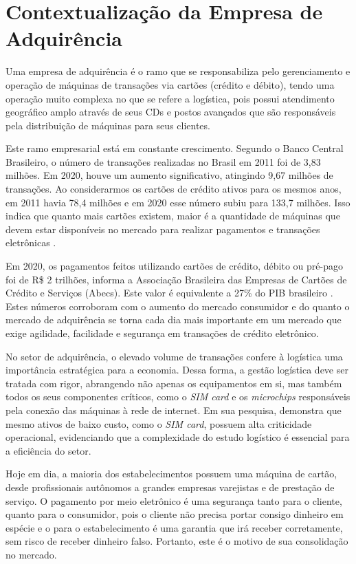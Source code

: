 \section[Contextualização da Empresa de Adquirência]{Contextualização da Empresa de Adquirência}
\label{Tecnologias}

Uma empresa de adquirência é o ramo que se responsabiliza pelo gerenciamento e operação de máquinas de transações via cartões (crédito e débito), tendo uma operação muito complexa no que se refere a logística, pois possui atendimento geográfico amplo através de seus CDs e postos avançados que são responsáveis pela distribuição de máquinas para seus clientes.

Este ramo empresarial está em constante crescimento. Segundo o Banco Central Brasileiro, o número de transações realizadas no Brasil em 2011 foi de 3,83 milhões. Em 2020, houve um aumento significativo, atingindo 9,67 milhões de transações. Ao considerarmos os cartões de crédito ativos para os mesmos anos, em 2011 havia 78,4 milhões e em 2020 esse número subiu para 133,7 milhões. Isso indica que quanto mais cartões existem, maior é a quantidade de máquinas que devem estar disponíveis no mercado para realizar pagamentos e transações eletrônicas \cite{TNS}.

Em 2020, os pagamentos feitos utilizando cartões de crédito, débito ou pré-pago foi de R\$ 2 trilhões, informa a Associação Brasileira das Empresas de Cartões de Crédito e Serviços (Abecs). Este valor é equivalente a 27\% do PIB brasileiro \cite{Valenti1998}. Estes números corroboram com o aumento do mercado consumidor e do quanto o mercado de adquirência se torna cada dia mais importante em um mercado que exige agilidade, facilidade e segurança em transações de crédito eletrônico.

No setor de adquirência, o elevado volume de transações confere à logística uma importância estratégica para a economia. Dessa forma, a gestão logística deve ser tratada com rigor, abrangendo não apenas os equipamentos em si, mas também todos os seus componentes críticos, como o \emph{SIM card} e os \emph{microchips} responsáveis pela conexão das máquinas à rede de internet. Em sua pesquisa,  demonstra que mesmo ativos de baixo custo, como o \emph{SIM card}, possuem alta criticidade operacional, evidenciando que a complexidade do estudo logístico é essencial para a eficiência do setor.

Hoje em dia, a maioria dos estabelecimentos possuem uma máquina de cartão, desde profissionais autônomos a grandes empresas varejistas e de prestação de serviço. O pagamento por meio eletrônico é uma segurança tanto para o cliente, quanto para o consumidor, pois o cliente não precisa portar consigo dinheiro em espécie e o para o estabelecimento é uma garantia que irá receber corretamente, sem risco de receber dinheiro falso. Portanto, este é o motivo de sua consolidação no mercado.

